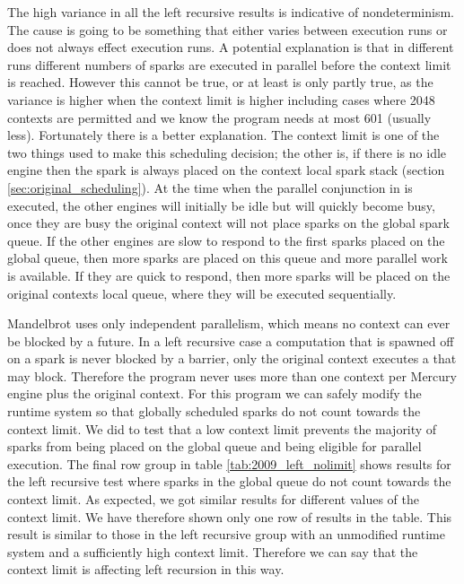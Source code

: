 The high variance in all the left recursive results is
indicative of nondeterminism.
The cause is going to be something that either varies between execution
runs or does not always effect execution runs.
A potential explanation is that in different runs different numbers of
sparks are executed in parallel before the context limit is reached.
However this cannot be true, or at least is only partly true,
as the variance is higher when the context limit is higher including cases
where 2048 contexts are permitted and we know the program needs at most 601
(usually less).
Fortunately there is a better explanation.
The context limit is one of the two things used to make this scheduling
decision;
the other is, if there is no idle engine then the spark is always
placed on the context local spark stack
(section \ref{sec:original_scheduling}).
At the time when the parallel conjunction in  is executed,
the other engines will initially be idle but will quickly become busy,
once they are busy the original context will not place sparks on the
global spark queue.
If the other engines are slow to respond to the first sparks placed
on the global queue,
then more sparks are placed on this queue and more
parallel work is available.
If they are quick to respond,
then more sparks will be placed on the original contexts local queue,
where they will be executed sequentially.

Mandelbrot uses only independent parallelism, which means no context can
ever be blocked by a future.
In a left recursive case a computation that is spawned off on a spark is
never blocked by a \joinandcontinue barrier,
only the original context executes a \joinandcontinue that may block.
Therefore the program never uses more than one context per Mercury engine
plus the original context.
For this program we can safely modify the runtime system so that globally
scheduled sparks do not count towards the context limit.
We did to test 
that a low context limit prevents the majority of sparks from being placed on
the global queue and being eligible for parallel execution.
The final row group in table
\ref{tab:2009_left_nolimit} shows results for the left recursive test
where sparks in the global queue do not count towards the context limit.
As expected, we got similar results for different values of the context
limit.
We have therefore shown only one row of results in the table.
This result is similar to those in the left recursive group with an
unmodified runtime system and a sufficiently high context limit.
Therefore we can say that the context limit is affecting left recursion in
this way.

